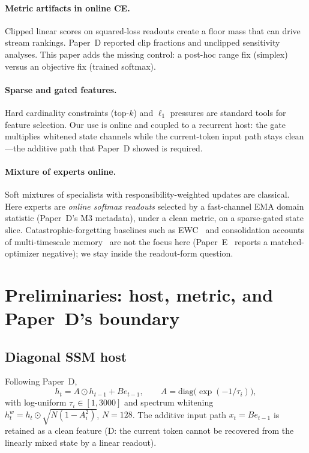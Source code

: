 \documentclass[preprint,12pt]{elsarticle}
\begin{document}
\paragraph{Metric artifacts in online CE.}
Clipped linear scores on squared-loss readouts create a floor mass
that can drive stream rankings. Paper~D reported clip fractions and
unclipped sensitivity analyses. This paper adds the missing control:
a post-hoc range fix (simplex) versus an objective fix (trained
softmax).

\paragraph{Sparse and gated features.}
Hard cardinality constraints (top-$k$) and $\ell_1$ pressures are
standard tools for feature selection. Our use is online and coupled
to a recurrent host: the gate multiplies whitened state channels while
the current-token input path stays clean---the additive path that
Paper~D showed is required.

\paragraph{Mixture of experts online.}
Soft mixtures of specialists with responsibility-weighted updates are
classical. Here experts are \emph{online softmax readouts} selected by
a fast-channel EMA domain statistic (Paper~D's M3 metadata), under a
clean metric, on a sparse-gated state slice. Catastrophic-forgetting
baselines such as EWC~\cite{kirkpatrick2017} and consolidation accounts
of multi-timescale memory~\cite{benna2016} are not the focus here
(Paper~E~\cite{epaper} reports a matched-optimizer negative); we stay inside the
readout-form question.

\section{Preliminaries: host, metric, and Paper~D's boundary}
\label{sec:prelim}

\subsection{Diagonal SSM host}
Following Paper~D,
\begin{equation}
h_t = A\odot h_{t-1} + B e_{t-1},\qquad
A=\mathrm{diag}\big(\exp(-1/\tau_i)\big),
\end{equation}
with log-uniform $\tau_i\in[1,3000]$ and spectrum whitening
$h^w_t = h_t\odot\sqrt{N(1-A_i^2)}$, $N=128$.
The additive input path $x_t=B e_{t-1}$ is retained as a clean feature
(D: the current token cannot be recovered from the linearly mixed
state by a linear readout).
\end{document}
